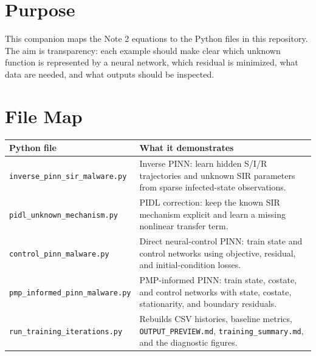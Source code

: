 \documentclass[11pt,a4paper]{article}
\begin{document}
\tableofcontents
\newpage
{}

\section{Purpose}
This companion maps the Note 2 equations to the Python files in this repository. The aim is transparency: each example should make clear which unknown function is represented by a neural network, which residual is minimized, what data are needed, and what outputs should be inspected.

\section{File Map}
\begin{longtable}{p{}p{}}
\toprule
Python file & What it demonstrates \\
\midrule
\small\texttt{inverse\_pinn\_sir\_malware.py} & Inverse PINN: learn hidden S/I/R trajectories and unknown SIR parameters from sparse infected-state observations. \\
\small\texttt{pidl\_unknown\_mechanism.py} & PIDL correction: keep the known SIR mechanism explicit and learn a missing nonlinear transfer term. \\
\small\texttt{control\_pinn\_malware.py} & Direct neural-control PINN: train state and control networks using objective, residual, and initial-condition losses. \\
\small\texttt{pmp\_informed\_pinn\_malware.py} & PMP-informed PINN: train state, costate, and control networks with state, costate, stationarity, and boundary residuals. \\
\small\texttt{run\_training\_iterations.py} & Rebuilds CSV histories, baseline metrics, \texttt{OUTPUT\_PREVIEW.md}, \texttt{training\_summary.md}, and the diagnostic figures. \\
\bottomrule
\end{longtable}
\end{document}
